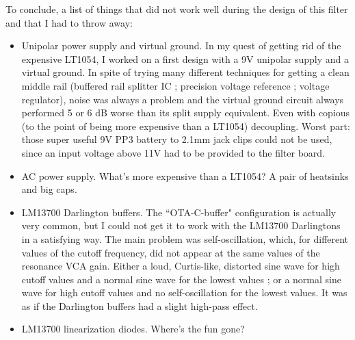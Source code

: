 \documentclass[a4paper,11pt]{article}
\begin{document}
To conclude, a list of things that did not work well during the design of this filter and that I had to throw away:

\begin{itemize}
\item Unipolar power supply and virtual ground. In my quest of getting rid of the expensive LT1054, I worked on a first design with a 9V unipolar supply and a virtual ground. In spite of trying many different techniques for getting a clean middle rail (buffered rail splitter IC ; precision voltage reference ; voltage regulator), noise was always a problem and the virtual ground circuit always performed 5 or 6 dB worse than its split supply equivalent. Even with copious (to the point of being more expensive than a LT1054) decoupling. Worst part: those super useful 9V PP3 battery to 2.1mm jack clips could not be used, since an input voltage above 11V had to be provided to the filter board.
\item AC power supply. What's more expensive than a LT1054? A pair of heatsinks and big caps.
\item LM13700 Darlington buffers. The ``OTA-C-buffer" configuration is actually very common, but I could not get it to work with the LM13700 Darlingtons in a satisfying way. The main problem was self-oscillation, which, for different values of the cutoff frequency, did not appear at the same values of the resonance VCA gain. Either a loud, Curtis-like, distorted sine wave for high cutoff values and a normal sine wave for the lowest values ; or a normal sine wave for high cutoff values and no self-oscillation for the lowest values. It was as if the Darlington buffers had a slight high-pass effect.
\item LM13700 linearization diodes. Where's the fun gone?
\end{itemize}
\end{document}
